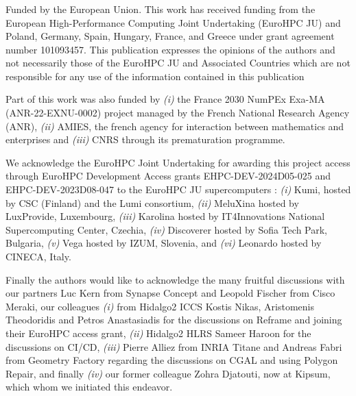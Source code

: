 \documentclass[runningheads]{llncs}
\begin{document}
\begin{credits}
\subsubsection{\ackname} Funded by the  European  Union. This work has received funding from the European High-Performance Computing Joint Undertaking (EuroHPC JU)  and  Poland, Germany,  Spain,  Hungary,  France, and Greece under grant agreement number 101093457. This  publication  expresses  the  opinions  of  the  authors  and  not  necessarily those of the EuroHPC JU and Associated Countries which are not responsible for any use of the information contained in this publication

Part of this work was also funded by \textit{(i)} the France 2030 NumPEx Exa-MA (ANR-22-EXNU-0002) project managed by the French National Research Agency (ANR), \textit{(ii)} AMIES, the french agency for interaction between mathematics and enterprises and \textit{(iii)} CNRS through its prematuration programme.

We acknowledge the EuroHPC Joint Undertaking for awarding this project access through  EuroHPC Development Access grants EHPC-DEV-2024D05-025 and EHPC-DEV-2023D08-047 to the EuroHPC JU supercomputers : \textit{(i)} Kumi, hosted by CSC (Finland) and the Lumi consortium, \textit{(ii)} MeluXina hosted by LuxProvide, Luxembourg, \textit{(iii)} Karolina hosted by IT4Innovations National Supercomputing Center, Czechia, \textit{(iv)} Discoverer hosted by Sofia Tech Park, Bulgaria, \textit{(v)} Vega hosted by IZUM, Slovenia, and \textit{(vi)} Leonardo hosted by CINECA, Italy.


Finally the authors would like to acknowledge the many fruitful discussions with our partners Luc Kern from Synapse Concept and Leopold Fischer from Cisco Meraki, our colleagues \textit{(i)} from Hidalgo2 ICCS Kostis Nikas, Aristomenis Theodoridis and Petros Anastasiadis for the discussions on Reframe and joining their EuroHPC access grant, \textit{(ii)} Hidalgo2 HLRS Sameer Haroon for the discussions on CI/CD, \textit{(iii)} Pierre Alliez from INRIA Titane and Andreas Fabri from Geometry Factory regarding the discussions on CGAL and using Polygon Repair, and finally \textit{(iv)} our former colleague Zohra Djatouti, now at Kipsum, which whom we initiated this endeavor.

\end{credits}
\end{document}
